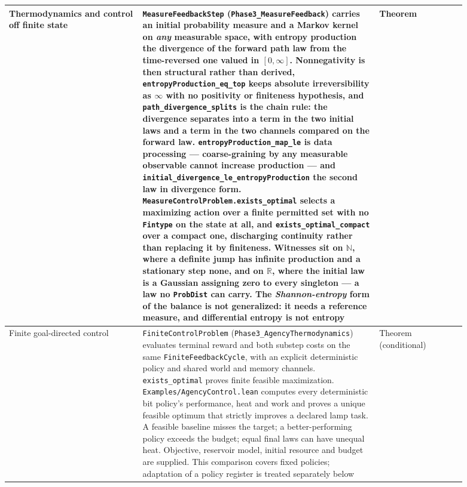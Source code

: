 \documentclass{article}
\begin{document}
\begin{longtable}{|>{\raggedright\arraybackslash}p{0.26\linewidth}|>{\raggedright\arraybackslash}p{0.46\linewidth}|>{\raggedright\arraybackslash}p{0.17\linewidth}|}
Thermodynamics and control off finite state & \texttt{MeasureFeedbackStep} (\nolinkurl{Phase3_MeasureFeedback}) carries an initial probability measure and a Markov kernel on \emph{any} measurable space, with entropy production the divergence of the forward path law from the time-reversed one valued in $[0,\infty]$. Nonnegativity is then structural rather than derived, \nolinkurl{entropyProduction_eq_top} keeps absolute irreversibility as $\infty$ with no positivity or finiteness hypothesis, and \nolinkurl{path_divergence_splits} is the chain rule: the divergence separates into a term in the two initial laws and a term in the two channels compared on the forward law. \nolinkurl{entropyProduction_map_le} is data processing --- coarse-graining by any measurable observable cannot increase production --- and \nolinkurl{initial_divergence_le_entropyProduction} the second law in divergence form. \nolinkurl{MeasureControlProblem.exists_optimal} selects a maximizing action over a finite permitted set with no \texttt{Fintype} on the state at all, and \nolinkurl{exists_optimal_compact} over a compact one, discharging continuity rather than replacing it by finiteness. Witnesses sit on $\mathbb{N}$, where a definite jump has infinite production and a stationary step none, and on $\mathbb{R}$, where the initial law is a Gaussian assigning zero to every singleton --- a law no \texttt{ProbDist} can carry. The \emph{Shannon-entropy} form of the balance is not generalized: it needs a reference measure, and differential entropy is not entropy & Theorem \\ \hline
Finite goal-directed control & \texttt{FiniteControlProblem} (\nolinkurl{Phase3_AgencyThermodynamics}) evaluates terminal reward and both substep costs on the same \texttt{FiniteFeedbackCycle}, with an explicit deterministic policy and shared world and memory channels. \texttt{exists\_optimal} proves finite feasible maximization. \nolinkurl{Examples/AgencyControl.lean} computes every deterministic bit policy's performance, heat and work and proves a unique feasible optimum that strictly improves a declared lamp task. A feasible baseline misses the target; a better-performing policy exceeds the budget; equal final laws can have unequal heat. Objective, reservoir model, initial resource and budget are supplied. This comparison covers fixed policies; adaptation of a policy register is treated separately below & Theorem (conditional) \\ \hline

\end{longtable}
\end{document}
